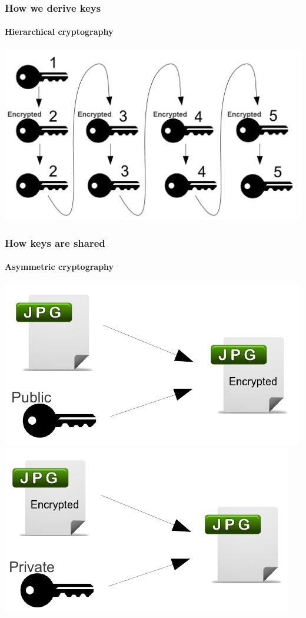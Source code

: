 \documentclass{beamer}
\begin{document}
  
  \begin{frame}
  \frametitle{How we derive keys}
  \framesubtitle{Hierarchical cryptography}
  \begin{center}
  	\includegraphics[scale=0.55]{images/keyDerivation/keyDerivation_scissored.pdf}
  \end{center}
  \end{frame}
  
  \begin{frame}
	\frametitle{How keys are shared}
	\framesubtitle{Asymmetric cryptography}
	\begin{center}
	\includegraphics[scale=0.7]{images/asymmetricCrypt/encryption_scissored.pdf} \\
	\includegraphics[scale=0.7]{images/asymmetricCrypt/decryption_scissored.pdf}
	\end{center}
	\end{frame}  
  
\end{document}

